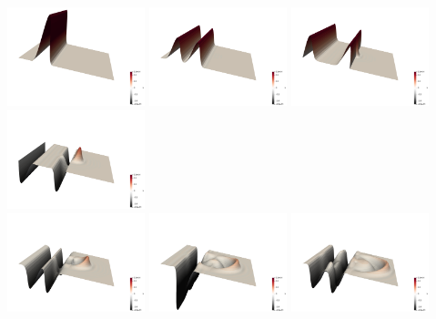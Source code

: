 \begin{center}
\includegraphics[width=4cm]{python_codes/fieldstone_165/results4/uuu0000.png}
\includegraphics[width=4cm]{python_codes/fieldstone_165/results4/uuu0050.png}
\includegraphics[width=4cm]{python_codes/fieldstone_165/results4/uuu0100.png}
\includegraphics[width=4cm]{python_codes/fieldstone_165/results4/uuu0150.png}\\
\includegraphics[width=4cm]{python_codes/fieldstone_165/results4/uuu0200.png}
\includegraphics[width=4cm]{python_codes/fieldstone_165/results4/uuu0250.png}
\includegraphics[width=4cm]{python_codes/fieldstone_165/results4/uuu0300.png}

\end{center}
